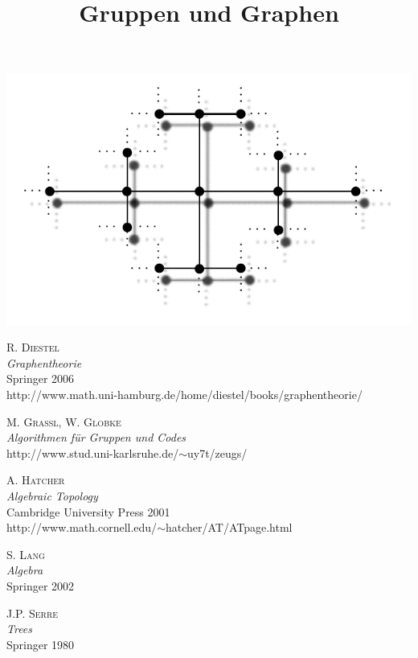 \documentclass[a4paper, 12pt, twoside]{article}
\title{\Huge \textbf{
\textsf{Gruppen und Graphen}}}
\date{}
\begin{document}
\maketitle
\begin{center}
	\includegraphics{grugraImages/titel}
\end{center}
\newpage
\tableofcontents
\newpage







\appendix



\newpage
\begin{thebibliography}{10}

 \textsc{R. Diestel}\\
\textsl{Graphentheorie}\\
Springer 2006\\
\textsf{http://www.math.uni-hamburg.de/home/diestel/books/graphentheorie/}

 \textsc{M. Grassl, W. Globke}\\
\textsl{Algorithmen für Gruppen und Codes}\\
\textsf{http://www.stud.uni-karlsruhe.de/$\sim$uy7t/zeugs/}

 \textsc{A. Hatcher}\\
\textsl{Algebraic Topology}\\
Cambridge University Press 2001\\
\textsf{http://www.math.cornell.edu/$\sim$hatcher/AT/ATpage.html}

 \textsc{S. Lang}\\
\textsl{Algebra}\\
Springer 2002

 \textsc{J.P. Serre}\\
\textsl{Trees}\\
Springer 1980



\end{thebibliography}

\newpage
{}
\small
\printindex
\end{document}
